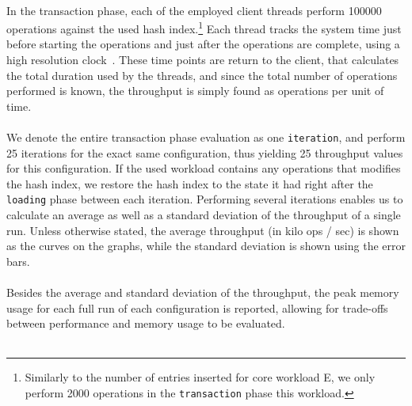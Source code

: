 \documentclass[11pt]{report} %
\begin{document}
\\
In the transaction phase, each of the employed client threads perform 100000 operations against the used hash index.\footnote{Similarly to the number of entries inserted for core workload E, we only perform 2000 operations in the \verb|transaction| phase this workload.} Each thread tracks the system time just before starting the operations and just after the operations are complete, using a high resolution clock~\cite{chrono}. These time points are return to the client, that calculates the total duration used by the threads, and since the total number of operations performed is known, the throughput is simply found as operations per unit of time.\\
\\
We denote the entire transaction phase evaluation as one \verb|iteration|, and perform 25 iterations for the exact same configuration, thus yielding 25 throughput values for this configuration. If the used workload contains any operations that modifies the hash index, we restore the hash index to the state it had right after the \verb|loading| phase between each iteration. Performing several iterations enables us to calculate an average as well as a standard deviation of the throughput of a single run. Unless otherwise stated, the average throughput (in kilo ops / sec) is shown as the curves on the graphs, while the standard deviation is shown using the error bars.\\
\\
Besides the average and standard deviation of the throughput, the peak memory usage for each full run of each configuration is reported, allowing for trade-offs between performance and memory usage to be evaluated.\\
\\
\end{document}
